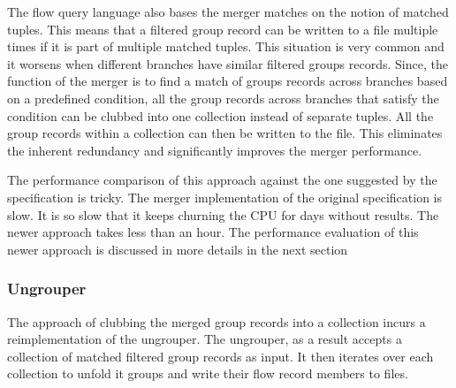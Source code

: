 The flow query language also bases the merger matches on the notion of matched
tuples. This means that a filtered group record can be written to a file
multiple times if it is part of multiple matched tuples. This situation is
very common and it worsens when different branches have similar filtered
groups records. Since, the function of the merger is to find a match of groups
records across branches based on a predefined condition, all the group records
across branches that satisfy the condition can be clubbed into one collection
instead of separate tuples. All the group records within a collection can then
be written to the file. This eliminates the inherent redundancy and
significantly improves the merger performance.

The performance comparison of this approach against the one suggested by the
specification is tricky. The merger implementation of the original
specification is slow. It is so slow that it keeps churning the CPU for days
without results. The newer approach takes less than an hour. The performance
evaluation of this newer approach is discussed in more details in the next
section

\subsubsection{Ungrouper} The approach of clubbing the merged group records into
a collection incurs a reimplementation of the ungrouper. The ungrouper, as a
result accepts a collection of matched filtered group records as input. It
then iterates over each collection to unfold it groups and write their flow
record members to files.

